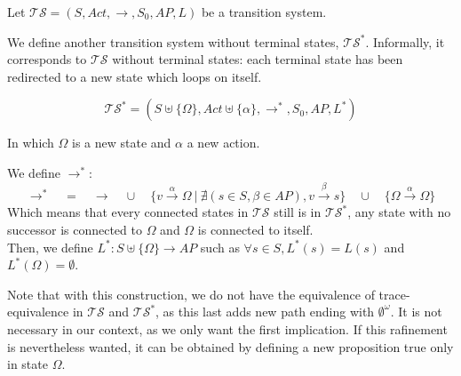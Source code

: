 \documentclass[11pt,a4paper]{article}
\def\ts{\mathcal{TS}}
\def\tss{\mathcal{TS^*}}
\begin{document}
\begin{Answer}[number=2]
\Question%
Let $\ts=(S,\mathit{Act},\rightarrow,S_0,\mathit{AP},L)$ be a transition system.

We define another transition system without terminal states, $\tss$. Informally, it corresponds to $\ts$ without terminal states: each terminal state has been redirected to a new state which loops on itself.

$$\tss=(S\uplus\{\Omega\},\mathit{Act}\uplus\{\alpha\},\rightarrow^*,S_0,\mathit{AP},L^*)$$

In which $\Omega$ is a new state and $\alpha$ a new action.

We define $\rightarrow^*$:
$$\rightarrow^*\quad=\quad\rightarrow\quad\cup\quad\{v\xrightarrow{\alpha} \Omega~|~\nexists (s\in S, \beta\in\mathit{AP}), v\xrightarrow{\beta}s\}\quad\cup\quad\{\Omega\xrightarrow{\alpha}\Omega\}$$
Which means that every connected states in $\mathcal{TS}$ still is in $\mathcal{TS^*}$, any state with no successor is connected to $\Omega$ and $\Omega$ is connected to itself.\\

Then, we define $L^* : S\uplus\{\Omega\} \longrightarrow \mathit{AP}$ such as $\forall s\in S,  L^*(s) = L(s)$ and $L^*(\Omega) = \emptyset$. \\
\par Note that with this construction, we do not have the equivalence of trace-equivalence in $\ts$ and $\tss$, as this last adds new path ending with $\emptyset^\omega$. 
It is not necessary in our context, as we only want the first implication. If this rafinement is nevertheless wanted, it can be obtained by defining a new proposition true only in state $\Omega$.


\end{Answer}
\end{document}

